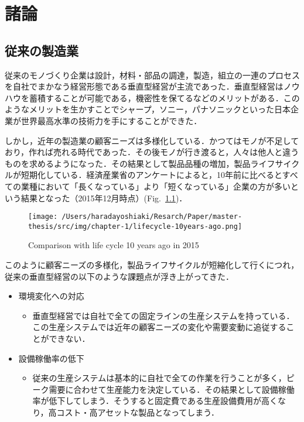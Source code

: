 \hypertarget{ux8af8ux8ad6}{%
\chapter{諸論}\label{ux8af8ux8ad6}}

\hypertarget{ux5f93ux6765ux306eux88fdux9020ux696d}{%
\section{従来の製造業}\label{ux5f93ux6765ux306eux88fdux9020ux696d}}

従来のモノづくり企業は設計，材料・部品の調達，製造，組立の一連のプロセスを自社でまかなう経営形態である垂直型経営が主流であった\cite{Suichoku}．垂直型経営はノウハウを蓄積することが可能である，機密性を保てるなどのメリットがある．このようなメリットを生かすことでシャープ，ソニー，パナソニックといった日本企業が世界最高水準の技術力を手にすることができた．

しかし，近年の製造業の顧客ニーズは多様化している．かつてはモノが不足しており，作れば売れる時代であった\cite{urenai}．その後モノが行き渡ると，人々は他人と違うものを求めるようになった．その結果として製品品種の増加，製品ライフサイクルが短期化している．経済産業省のアンケートによると，10年前に比べるとすべての業種において「長くなっている」より「短くなっている」企業の方が多いという結果となった\cite{keizai-lifecycle}（2015年12月時点）(Fig.~\ref{fig:lifecycle-10years-ago})．

\begin{figure}[H]
\hypertarget{fig:lifecycle-10years-ago}{%
\centering
\texttt{[image: /Users/haradayoshiaki/Resarch/Paper/master-thesis/src/img/chapter-1/lifecycle-10years-ago.png]}
\caption{Comparison with life cycle 10 years ago in
2015\cite{keizai-lifecycle}}\label{fig:lifecycle-10years-ago}
}
\end{figure}

このように顧客ニーズの多様化，製品ライフサイクルが短縮化して行くにつれ，従来の垂直型経営の以下のような課題点が浮き上がってきた．

\begin{itemize}
\tightlist
\item
  環境変化への対応

  \begin{itemize}
  \tightlist
  \item
    垂直型経営では自社で全ての固定ラインの生産システムを持っている．この生産システムでは近年の顧客ニーズの変化や需要変動に追従することができない．
  \end{itemize}
\item
  設備稼働率の低下

  \begin{itemize}
  \tightlist
  \item
    従来の生産システムは基本的に自社で全ての作業を行うことが多く，ピーク需要に合わせて生産能力を決定している．その結果として設備稼働率が低下してしまう．そうすると固定費である生産設備費用が高くなり，高コスト・高アセットな製品となってしまう．
  \end{itemize}
\end{itemize}

